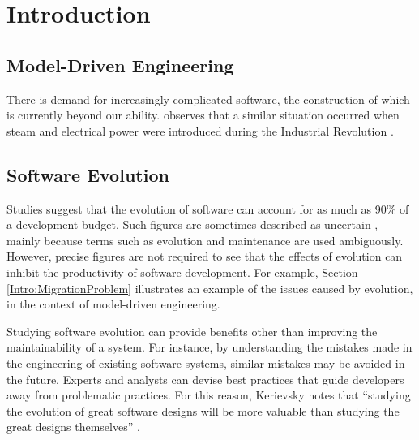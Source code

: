
\chapter{Introduction}
\label{Introduction}

\section{Model-Driven Engineering}

There is demand for increasingly complicated software, the construction of which is currently beyond our ability. \cite{selic03pragmatics} observes that a similar situation occurred when steam and electrical power were introduced during the Industrial Revolution \cite{pool97society}. 

\section{Software Evolution}

Studies \cite{erlikh00leveraging,moad90maintaining} suggest that the evolution of software can account for as much as 90\% of a development budget. Such figures are sometimes described as uncertain \cite[ch. 21]{sommerville06software}, mainly because terms such as evolution and maintenance are used ambiguously. However, precise figures are not required to see that the effects of evolution can inhibit the productivity of software development. For example, Section \ref{Intro:MigrationProblem} illustrates an example of the issues caused by evolution, in the context of model-driven engineering.

Studying software evolution can provide benefits other than improving the maintainability of a system. For instance, by understanding the mistakes made in the engineering of existing software systems, similar mistakes may be avoided in the future. Experts and analysts can devise best practices that guide developers away from problematic practices. For this reason, Kerievsky notes that ``studying the evolution of great software designs will be more valuable than studying the great designs themselves'' \cite{kerievsky04refactoring}.

